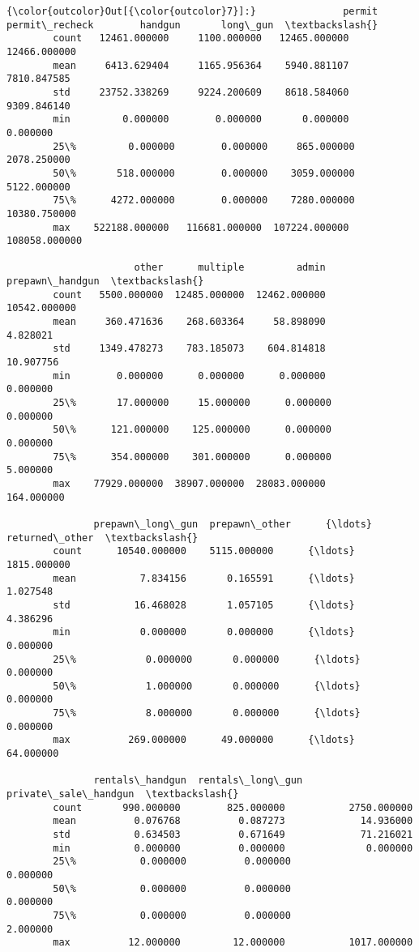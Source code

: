 \documentclass[11pt]{article}
\begin{document}
\begin{Verbatim}[commandchars=\\\{\}]
{\color{outcolor}Out[{\color{outcolor}7}]:}               permit  permit\_recheck        handgun       long\_gun  \textbackslash{}
        count   12461.000000     1100.000000   12465.000000   12466.000000   
        mean     6413.629404     1165.956364    5940.881107    7810.847585   
        std     23752.338269     9224.200609    8618.584060    9309.846140   
        min         0.000000        0.000000       0.000000       0.000000   
        25\%         0.000000        0.000000     865.000000    2078.250000   
        50\%       518.000000        0.000000    3059.000000    5122.000000   
        75\%      4272.000000        0.000000    7280.000000   10380.750000   
        max    522188.000000   116681.000000  107224.000000  108058.000000   
        
                      other      multiple         admin  prepawn\_handgun  \textbackslash{}
        count   5500.000000  12485.000000  12462.000000     10542.000000   
        mean     360.471636    268.603364     58.898090         4.828021   
        std     1349.478273    783.185073    604.814818        10.907756   
        min        0.000000      0.000000      0.000000         0.000000   
        25\%       17.000000     15.000000      0.000000         0.000000   
        50\%      121.000000    125.000000      0.000000         0.000000   
        75\%      354.000000    301.000000      0.000000         5.000000   
        max    77929.000000  38907.000000  28083.000000       164.000000   
        
               prepawn\_long\_gun  prepawn\_other      {\ldots}        returned\_other  \textbackslash{}
        count      10540.000000    5115.000000      {\ldots}           1815.000000   
        mean           7.834156       0.165591      {\ldots}              1.027548   
        std           16.468028       1.057105      {\ldots}              4.386296   
        min            0.000000       0.000000      {\ldots}              0.000000   
        25\%            0.000000       0.000000      {\ldots}              0.000000   
        50\%            1.000000       0.000000      {\ldots}              0.000000   
        75\%            8.000000       0.000000      {\ldots}              0.000000   
        max          269.000000      49.000000      {\ldots}             64.000000   
        
               rentals\_handgun  rentals\_long\_gun  private\_sale\_handgun  \textbackslash{}
        count       990.000000        825.000000           2750.000000   
        mean          0.076768          0.087273             14.936000   
        std           0.634503          0.671649             71.216021   
        min           0.000000          0.000000              0.000000   
        25\%           0.000000          0.000000              0.000000   
        50\%           0.000000          0.000000              0.000000   
        75\%           0.000000          0.000000              2.000000   
        max          12.000000         12.000000           1017.000000   
        

\end{Verbatim}
\end{document}
